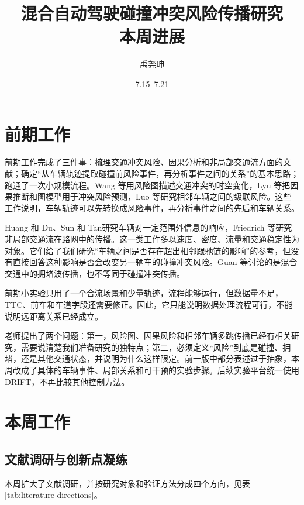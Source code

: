 \documentclass[UTF8,zihao=5,a4paper]{ctexart}
\title{\vspace{-1.25cm}\textbf{混合自动驾驶碰撞冲突风险传播研究\\本周进展}}
\author{禹尧珅}
\date{7.15--7.21}
\begin{document}
\pagestyle{plain}
\maketitle
\vspace{-0.8cm}

\section{前期工作}

前期工作完成了三件事：梳理交通冲突风险、因果分析和非局部交通流方面的文献；确定“从车辆轨迹提取碰撞前风险事件，再分析事件之间的关系”的基本思路；跑通了一次小规模流程。Wang 等\cite{wang2024conflict}用风险图描述交通冲突的时空变化，Lyu 等\cite{lyu2025causal}把因果推断和图模型用于冲突风险预测，Luo 等\cite{luo2026crm}研究相邻车辆之间的级联风险。这些工作说明，车辆轨迹可以先转换成风险事件，再分析事件之间的先后和车辆关系。

Huang 和 Du\cite{huang2022nonlocal}、Sun 和 Tan\cite{sun2020lookahead}研究车辆对一定范围外信息的响应，Friedrich 等\cite{friedrich2022network}研究非局部交通流在路网中的传播。这一类工作多以速度、密度、流量和交通稳定性为对象。它们给了我们研究“车辆之间是否存在超出相邻跟驰链的影响”的参考，但没有直接回答这种影响是否会改变另一辆车的碰撞冲突风险。Guan 等\cite{guan2025jam}讨论的是混合交通中的拥堵波传播，也不等同于碰撞冲突传播。

前期小实验只用了一个合流场景和少量轨迹，流程能够运行，但数据量不足，TTC、前车和车道字段还需要修正。因此，它只能说明数据处理流程可行，不能说明远距离关系已经成立。

老师提出了两个问题：第一，风险图、因果风险和相邻车辆多跳传播已经有相关研究，需要说清楚我们准备研究的独特点；第二，必须定义“风险”到底是碰撞、拥堵，还是其他交通状态，并说明为什么这样限定。前一版中部分表述过于抽象，本周改成了具体的车辆事件、局部关系和可干预的实验步骤。后续实验平台统一使用 DRIFT，不再比较其他控制方法。

\section{本周工作}

\subsection{文献调研与创新点凝练}

本周扩大了文献调研，并按研究对象和验证方法分成四个方向，见表\ref{tab:literature-directions}。
\end{document}
